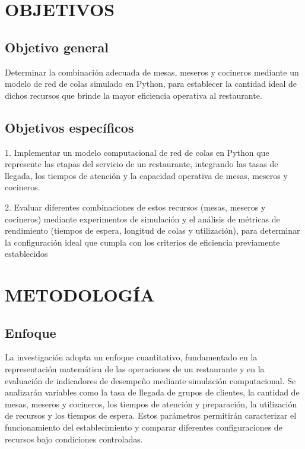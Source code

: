 \documentclass[10pt,a4paper,twocolumn]{article}
\begin{document}
\section{OBJETIVOS}

\subsection{Objetivo general}

Determinar la combinación adecuada de mesas, meseros y cocineros mediante un modelo de red de colas simulado en Python, para establecer la cantidad ideal de dichos recursos que brinde la mayor eficiencia operativa al restaurante.

\subsection{Objetivos específicos}

1. Implementar un modelo computacional de red de colas en Python que represente las etapas del servicio de un restaurante, integrando las tasas de llegada, los tiempos de atención y la capacidad operativa de mesas, meseros y cocineros.

2. Evaluar diferentes combinaciones de estos recursos (mesas, meseros y cocineros) mediante experimentos de simulación y el análisis de métricas de rendimiento (tiempos de espera, longitud de colas y utilización), para determinar la configuración ideal que cumpla con los criterios de eficiencia previamente establecidos

\section{METODOLOGÍA}

\subsection{Enfoque}

La investigación adopta un enfoque cuantitativo, fundamentado en la representación matemática de las operaciones de un restaurante y en la evaluación de indicadores de desempeño mediante simulación computacional. Se analizarán variables como la tasa de llegada de grupos de clientes, la cantidad de mesas, meseros y cocineros, los tiempos de atención y preparación, la utilización de recursos y los tiempos de espera. Estos parámetros permitirán caracterizar el funcionamiento del establecimiento y comparar diferentes configuraciones de recursos bajo condiciones controladas.
\end{document}
